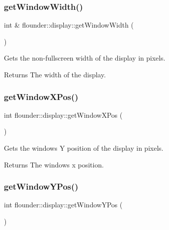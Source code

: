\subsubsection{\texorpdfstring{get\+Window\+Width()}{getWindowWidth()}}
{\footnotesize\ttfamily int \& flounder\+::display\+::get\+Window\+Width (\begin{DoxyParamCaption}{ }\end{DoxyParamCaption})}



Gets the non-\/fullscreen width of the display in pixels. 

\begin{DoxyReturn}{Returns}
The width of the display. 
\end{DoxyReturn}
\mbox{\label{classflounder_1_1display_adbf55bdf135324664810751f3ab27d82}} 
\subsubsection{\texorpdfstring{get\+Window\+X\+Pos()}{getWindowXPos()}}
{\footnotesize\ttfamily int flounder\+::display\+::get\+Window\+X\+Pos (\begin{DoxyParamCaption}{ }\end{DoxyParamCaption})}



Gets the windows Y position of the display in pixels. 

\begin{DoxyReturn}{Returns}
The windows x position. 
\end{DoxyReturn}
\mbox{\label{classflounder_1_1display_a92e7674dcd56f1e3f8b617a9b3fb625d}} 
\subsubsection{\texorpdfstring{get\+Window\+Y\+Pos()}{getWindowYPos()}}
{\footnotesize\ttfamily int flounder\+::display\+::get\+Window\+Y\+Pos (\begin{DoxyParamCaption}{ }\end{DoxyParamCaption})}



